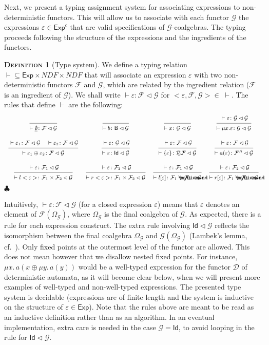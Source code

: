 \documentclass{LMCS}
\newcommand\D{\mathcal{D}}
\def\pow{{\mathcal P_{\!\!\!\omega}}}
\newcommand\E\varepsilon
\newcommand\Exp{\mathsf{Exp}}
\newcommand\ndf{\mathit{NDF}}
\newcommand\id{\mathsf{Id}}
\newcommand\B{\mathsf{B}}
\newcommand\G{\mathcal{G}}
\newcommand\F{\mathcal{F}}
\newcommand\emp{\underline\emptyset}
\newcommand{\rules}[2]{\mbox{$\frac {\mbox{\small \rule[-5pt]{0pt}{14pt} $#1$}}
                      {\mbox{\small \rule[0pt]{0pt}{10pt}$#2$}}$}}
\newcommand{\myplus}{\mathbin{\rlap{$\myDiamond$}\hspace*{.01cm}\raisebox{.14ex}{$+$}}}
\def\hyph{-\penalty0\hskip0pt\relax}
\theoremstyle{definition}
\newtheorem{mydefinition}{\textsc{Definition}}[section]
\theoremstyle{plain}
\theoremstyle{plain}
\theoremstyle{plain}
\theoremstyle{plain}
\theoremstyle{definition}
\theoremstyle{definition}
\newenvironment{definition}{
\begin{mydefinition}}
    {\hfill$\clubsuit$\end{mydefinition}}
\begin{document}
Next, we present a typing assignment system for associating
expressions to non\hyph deterministic functors. This will allow us to associate with each functor
$\G$ the expressions $\E\in \Exp^c$ that are valid specifications of
$\G$-coalgebras. The typing proceeds following
the structure of the expressions and the ingredients of the
functors.

\begin{definition}[Type system]\label{def:ts}
We define a typing relation $\vdash \subseteq \Exp \times \ndf
\times \ndf $ that will associate an expression $\E$ with two non\hyph
deterministic functors $\F$ and $\G$, which are related by the
ingredient relation ($\F$ is an ingredient of $\G$). We shall write
$\vdash \E\colon \F\lhd \G$ for $<\E,\F,\G> \in \;\vdash$.  The rules that define $\vdash$ are the following:
\[
\begin{array}{cccc}
\rules{}{\vdash \emp \colon \F\lhd \G }& 
\rules{}{\vdash b\colon \B\lhd \G}&
\rules{}{\vdash x \colon \G\lhd \G }&
\rules{\vdash\E\colon \G\lhd \G}
      {\vdash \mu x.\E \colon \G\lhd \G}\\\\
\rules{\vdash \E_1 \colon \F\lhd \G\;\;\;\; \vdash\E_2\colon \F\lhd
\G}{\vdash \E_1\oplus\E_2 \colon \F\lhd \G} &
\rules{\vdash \E \colon \G\lhd \G}
      {\vdash \E \colon \id\lhd \G}&
\rules{\vdash \E \colon \F \lhd \G}{\vdash \{\E\} \colon \pow \F \lhd \G}&
\rules{\vdash \E\colon \F\lhd \G}
      {\vdash a(\E) \colon \F^A\lhd \G}
\\\\
\rules{\vdash \E\colon \F_1\lhd \G}
      {\vdash l<\E> \colon \F_1\times \F_2\lhd \G}&
\rules{\vdash \E\colon \F_2\lhd \G}
      {\vdash r<\E> \colon \F_1\times \F_2\lhd \G}&
\rules{\vdash \E\colon \F_1\lhd \G}
      {\vdash l[\E] \colon \F_1\myplus \F_2\lhd \G}&
\rules{\vdash \E\colon \F_2\lhd \G}
      {\vdash r[\E] \colon \F_1\myplus \F_2\lhd \G}\end{array}
\]
\end{definition}
Intuitively, $\vdash \E\colon \F\lhd
\G$ (for a closed expression $\E$) means that $\E$ denotes an element 
 of $\F(\Omega_\G)$, where $\Omega_\G$ is the final
coalgebra of $\G$. As expected, there is a rule for each expression
construct. The extra rule involving $\id\lhd \G$ reflects
the isomorphism between the final coalgebra $\Omega_\G$ and
$\G(\Omega_\G)$ (Lambek's lemma, cf.~\cite{Rutten00}). Only fixed points at the outermost level of the
functor are allowed. This does not mean however that we disallow nested
fixed points. For instance, $\mu x.\, a(x \oplus \mu y.\, a(y))$ would be
a well-typed expression for the functor $\D$ of deterministic automata,
as it will become clear below, when we will present more examples of well-typed and non-well-typed
expressions. The presented type system is decidable
(expressions are of
finite length and the system is inductive on the structure of $\E\in
\Exp$). Note that the rules above are meant to be read as an inductive
definition rather than as an algorithm. In an eventual implementation,
extra care is needed in the case $\G=\id$, to avoid looping in the rule for
$\id\lhd \G$.  
\end{document}
